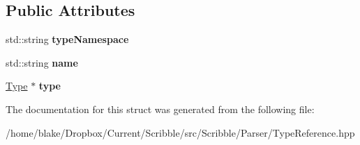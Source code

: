 \subsection*{Public Attributes}
\begin{DoxyCompactItemize}
\item 
\hypertarget{struct_scribble_core_1_1_type_reference_core_ac57d9db0ac167c1fdc653985bb4892ca}{std\-::string {\bfseries type\-Namespace}}\label{struct_scribble_core_1_1_type_reference_core_ac57d9db0ac167c1fdc653985bb4892ca}

\item 
\hypertarget{struct_scribble_core_1_1_type_reference_core_a0e2f05945e7ee59784a6b61865653df8}{std\-::string {\bfseries name}}\label{struct_scribble_core_1_1_type_reference_core_a0e2f05945e7ee59784a6b61865653df8}

\item 
\hypertarget{struct_scribble_core_1_1_type_reference_core_a0e0faeee3a107ae76ebe27c3d678d1a9}{\hyperlink{class_scribble_core_1_1_type}{Type} $\ast$ {\bfseries type}}\label{struct_scribble_core_1_1_type_reference_core_a0e0faeee3a107ae76ebe27c3d678d1a9}

\end{DoxyCompactItemize}


The documentation for this struct was generated from the following file\-:\begin{DoxyCompactItemize}
\item 
/home/blake/\-Dropbox/\-Current/\-Scribble/src/\-Scribble/\-Parser/Type\-Reference.\-hpp\end{DoxyCompactItemize}
